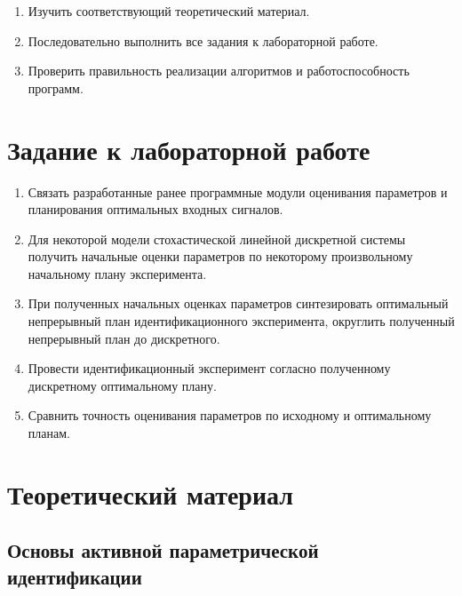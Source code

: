 \documentclass[a4paper,14pt]{extarticle}
\begin{document}
\begin{enumerate}
\item Изучить соответствующий теоретический материал.

\item Последовательно выполнить все задания к лабораторной работе.

\item Проверить правильность реализации алгоритмов и работоспособность
  программ.

\end{enumerate}

\section{Задание к лабораторной работе}

\begin{enumerate}

\item Связать разработанные ранее программные модули оценивания параметров
	и планирования оптимальных входных сигналов.

\item Для некоторой модели стохастической линейной дискретной системы 
	получить начальные оценки параметров по некоторому произвольному начальному
		плану эксперимента.

\item При полученных начальных оценках параметров синтезировать оптимальный
	непрерывный план идентификационного эксперимента, округлить полученный
		непрерывный план до дискретного.

\item Провести идентификационный эксперимент согласно полученному дискретному
	оптимальному плану.

\item Сравнить точность оценивания параметров по исходному и оптимальному
	планам.

\end{enumerate}

\section{Теоретический материал}

\subsection{Основы активной параметрической идентификации}
\end{document}
